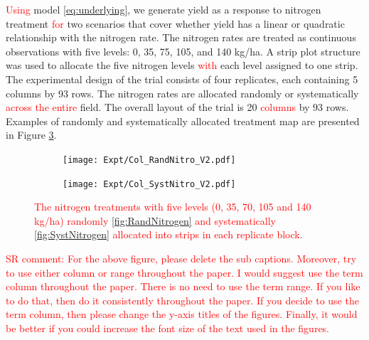 \documentclass[a4paper]{article} 	%
\newcommand{\revision}[1]{\textcolor{red}{#1}}
\begin{document}
\revision{Using} model \eqref{eq:underlying}, we generate yield as a response to nitrogen treatment \revision{for} two scenarios that cover whether yield has a linear or quadratic relationship with the nitrogen rate. The nitrogen rates are treated as continuous observations with five levels: 0, 35, 75, 105, and 140 kg/ha. A strip plot structure was used to allocate the five nitrogen levels \revision{with} each level assigned to one strip. The experimental design of the trial consists of four replicates, each containing 5 columns by 93 rows. The nitrogen rates are allocated randomly or systematically  \revision{across the entire} field. The overall layout of the trial is 20 \revision{columns} by 93 rows. Examples of randomly and systematically allocated treatment map are presented in Figure \ref{fig:Nitrogen}. 


\begin{figure}[!htp]
	\begin{subfigure}[t]{0.45\textwidth}
		\centering
		\texttt{[image: Expt/Col\_RandNitro\_V2.pdf]}
        \caption{}\label{fig:RandNitrogen}
	\end{subfigure}
	\hspace{0.05\textwidth}
	\begin{subfigure}[t]{0.45\textwidth}
		\centering
		\texttt{[image: Expt/Col\_SystNitro\_V2.pdf]}
        \caption{}\label{fig:SystNitrogen}
	\end{subfigure}
	\caption{\revision{The nitrogen treatments with five levels (0, 35, 70, 105 and 140 kg/ha) randomly \eqref{fig:RandNitrogen} and systematically \eqref{fig:SystNitrogen} allocated into strips in each replicate block.}}\label{fig:Nitrogen}
\end{figure}

\revision{SR comment: For the above figure, please delete the sub captions. Moreover, try to use either column or range throughout the paper. I would suggest use the term column throughout the paper. There is no need to use the term range. If you like to do that, then do it consistently throughout the paper. If you decide to use the term column, then please change the y-axis titles of the figures. Finally, it would be better if you could increase the font size of the text used in the figures.}
\end{document}

